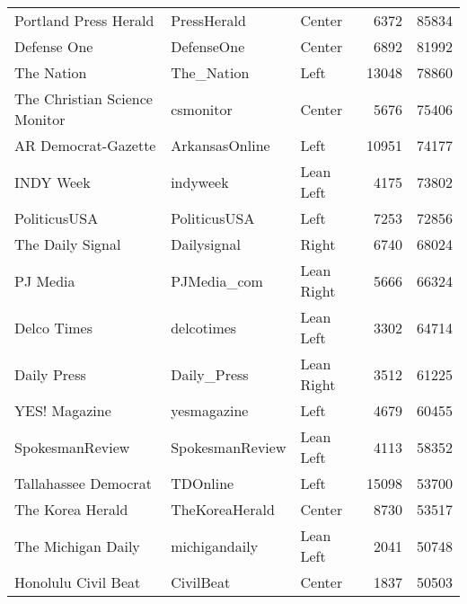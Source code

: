 \begin{tabular}{lllrr}
                    Portland Press Herald &      PressHerald &        Center &              6372 &      85834 \\
                              Defense One &       DefenseOne &        Center &              6892 &      81992 \\
                               The Nation &       The\_Nation &          Left &             13048 &      78860 \\
            The Christian Science Monitor &        csmonitor &        Center &              5676 &      75406 \\
                      AR Democrat-Gazette &   ArkansasOnline &          Left &             10951 &      74177 \\
                                INDY Week &         indyweek &     Lean Left &              4175 &      73802 \\
                             PoliticusUSA &     PoliticusUSA &          Left &              7253 &      72856 \\
                         The Daily Signal &      Dailysignal &         Right &              6740 &      68024 \\
                                 PJ Media &      PJMedia\_com &    Lean Right &              5666 &      66324 \\
                              Delco Times &       delcotimes &     Lean Left &              3302 &      64714 \\
                              Daily Press &      Daily\_Press &    Lean Right &              3512 &      61225 \\
                            YES! Magazine &      yesmagazine &          Left &              4679 &      60455 \\
                          SpokesmanReview &  SpokesmanReview &     Lean Left &              4113 &      58352 \\
                     Tallahassee Democrat &         TDOnline &          Left &             15098 &      53700 \\
                         The Korea Herald &   TheKoreaHerald &        Center &              8730 &      53517 \\
                       The Michigan Daily &    michigandaily &     Lean Left &              2041 &      50748 \\
                      Honolulu Civil Beat &        CivilBeat &        Center &              1837 &      50503 \\

\end{tabular}
